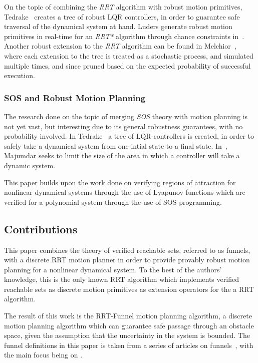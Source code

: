 On the topic of combining the \textit{RRT} algorithm with robust motion
primitives, Tedrake~\cite{tedrakeLQRtreesFeedbackMotion2009} creates a tree of
robust LQR controllers, in order to guarantee safe traversal of the dynamical
system at hand. Luders generate robust motion primitives in real-time for an
\textit{RRT*} algorithm through chance constraints in~\cite{luders2013robust}.
Another robust extension to the \textit{RRT} algorithm can be found in
Melchior~\cite{melchior2007particle}, where each extension to the tree is
treated as a stochastic process, and simulated multiple times, and since pruned
based on the expected probability of successful execution.


\subsubsection{SOS and Robust Motion Planning}

The research done on the topic of merging \textit{SOS} theory with motion
planning is not yet vast, but interesting due to its general robustness
guarantees, with no probability involved. In
Tedrake~\cite{tedrakeLQRtreesFeedbackMotion2009} a tree of LQR-controllers is
created, in order to safely take a dynamical system from one intial state to a
final state. In~\cite{majumdarFunnelLibrariesRealtime2017}, Majumdar seeks to
limit the size of the area in which a controller will take a dynamic system.


This paper builds upon the work done on verifying regions of attraction for
nonlinear dynamical systems through the use of Lyapunov functions which are
verified for a polynomial system through the use of SOS programming.

\subsection{Contributions}

This paper combines the theory of verified reachable sets, referred to as
funnels, with a discrete RRT motion planner in order to provide provably robust
motion planning for a nonlinear dynamical system. To the best of the authors'
knowledge, this is the only known RRT algorithm which implements verified
reachable sets as discrete motion primitives as extension operators for the a
RRT algorithm.

The result of this work is the RRT-Funnel motion planning algorithm, a discrete
motion planning algorithm which can guarantee safe passage through an obstacle
space, given the assumption that the uncertainty in the system is bounded. The
funnel definitions in this paper is taken from a series of articles on
funnels~\cite{Tobenkin_2011,tedrakeLQRtreesFeedbackMotion2009,
  majumdarRobustOnlineMotion2013,
  majumdarFunnelLibrariesRealtime2017,ahmadi2014dsos}, with the main focus being
on \cite{majumdarFunnelLibrariesRealtime2017}.



